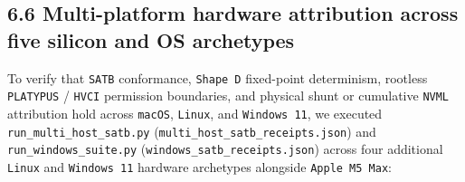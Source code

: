 \documentclass[10pt,letterpaper]{article}
\begin{document}
\subsection{6.6 Multi-platform hardware attribution across five silicon
and OS
archetypes}\label{multi-platform-hardware-attribution-across-five-silicon-and-os-archetypes}

To verify that \texttt{SATB} conformance, \texttt{Shape\ D} fixed-point
determinism, rootless \texttt{PLATYPUS} / \texttt{HVCI} permission
boundaries, and physical shunt or cumulative \texttt{NVML} attribution
hold across \texttt{macOS}, \texttt{Linux}, and \texttt{Windows\ 11}, we
executed \texttt{run\_\allowbreak{}multi\_\allowbreak{}host\_\allowbreak{}satb.\allowbreak{}py}
(\texttt{multi\_\allowbreak{}host\_\allowbreak{}satb\_\allowbreak{}receipts.\allowbreak{}json}) and
\texttt{run\_\allowbreak{}windows\_\allowbreak{}suite.\allowbreak{}py} (\texttt{windows\_\allowbreak{}satb\_\allowbreak{}receipts.\allowbreak{}json})
across four additional \texttt{Linux} and \texttt{Windows\ 11} hardware
archetypes alongside \texttt{Apple\ M5\ Max}:
\end{document}
